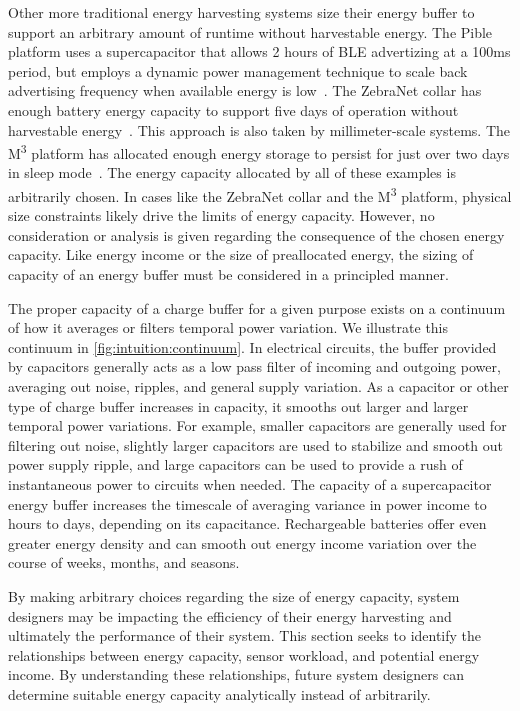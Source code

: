 
Other more traditional energy harvesting systems size their energy buffer to support an arbitrary amount of runtime without harvestable energy.
The Pible platform uses a supercapacitor that allows 2 hours of BLE advertizing at a 100ms period, but employs a dynamic power management technique to scale back advertising frequency when available energy is low~\cite{fraternali2018pible}.
The ZebraNet collar has enough battery energy capacity to support five days of operation without harvestable energy~\cite{juang2002energy}.
This approach is also taken by millimeter-scale systems. The M\textsuperscript{3} platform has allocated enough energy storage to persist for just over two days in sleep mode~\cite{lee2013modular}.
The energy capacity allocated by all of these examples is arbitrarily chosen.
In cases like the ZebraNet collar and the M\textsuperscript{3} platform, physical size constraints likely drive the limits of energy capacity.
However, no consideration or analysis is given regarding the consequence of the chosen energy capacity.
Like energy income or the size of preallocated energy, the sizing of capacity of an energy buffer must be considered in a principled manner.

The proper capacity of a charge buffer for a given purpose exists on a continuum of how it averages or filters temporal power variation.
We illustrate this continuum in \cref{fig:intuition:continuum}.
In electrical circuits, the buffer provided by capacitors generally acts as a low pass filter of incoming and outgoing power, averaging out noise, ripples, and general supply variation.
As a capacitor or other type of charge buffer increases in capacity, it smooths out larger and larger temporal power variations. 
For example, smaller capacitors are generally used for filtering out noise, slightly larger capacitors are used to stabilize and smooth out power supply ripple, and large capacitors can be used to provide a rush of instantaneous power to circuits when needed.
The capacity of a supercapacitor energy buffer increases the timescale of averaging variance in power income to hours to days, depending on its capacitance.
Rechargeable batteries offer even greater energy density and can smooth out energy income variation over the course of weeks, months, and seasons.

By making arbitrary choices regarding the size of energy capacity, system designers may be impacting the efficiency of their energy harvesting and ultimately the performance of their system.
This section seeks to identify the relationships between energy capacity, sensor workload, and potential energy income.
By understanding these relationships, future system designers can determine suitable energy capacity analytically
instead of arbitrarily.  

